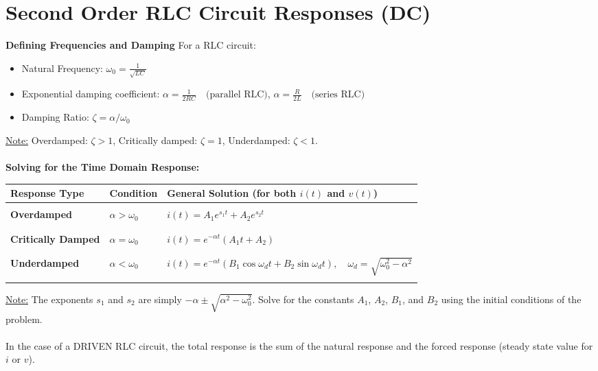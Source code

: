 \documentclass[12pt]{article}
\begin{document}
\section*{Second Order RLC Circuit Responses (DC)}
\textbf{Defining Frequencies and Damping}
For a RLC circuit:
\begin{itemize}
    \item Natural Frequency: $\omega_0 = \frac{1}{\sqrt{LC}}$
    \item Exponential damping coefficient: $\alpha = \frac{1}{2RC}\quad \text{(parallel RLC)}$, $\alpha = \frac{R}{2L}\quad \text{(series RLC)}$
    \item Damping Ratio: $\zeta = \alpha/\omega_0$
\end{itemize}
\underline{Note:} Overdamped: $\zeta > 1$, Critically damped: $\zeta = 1$, Underdamped: $\zeta < 1$.\\\\
\textbf{Solving for the Time Domain Response:}
\begin{table}[H]
\centering
\begin{tabular}{lll}
\hline
\textbf{Response Type} & \textbf{Condition} & \textbf{General Solution (for both $i(t)$ and $v(t)$)} \\ \hline
& & \\
\textbf{Overdamped} & $\alpha > \omega_0$ & $i(t) = A_1e^{s_1t} + A_2e^{s_2t}$ \\
& & \\ \hline
& & \\
\textbf{Critically Damped} & $\alpha = \omega_0$ & $i(t) = e^{-\alpha t}(A_1t + A_2)$ \\
& & \\ \hline
& & \\
\textbf{Underdamped} & $\alpha < \omega_0$ & $i(t) = e^{-\alpha t}(B_1 \cos \omega_d t + B_2 \sin \omega_d t),\quad \omega_d = \sqrt{\omega_0^2 - \alpha^2}$ \\
& & \\ \hline
\end{tabular}
\end{table}
\noindent
\underline{Note:} The exponents $s_1$ and $s_2$ are simply $-\alpha \pm \sqrt{\alpha^2 - \omega_0^2}$. Solve for the constants $A_1$, $A_2$, $B_1$, and $B_2$ using the initial conditions of the problem.\\\\
In the case of a DRIVEN RLC circuit, the total response is the sum of the natural response and the forced response (steady state value for $i$ or $v$).
\end{document}
